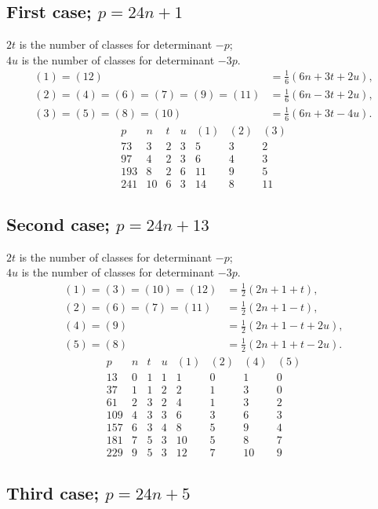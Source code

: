 \documentclass[12pt]{article}
\begin{document}
\subsection*{First case; \(p=24n+1\)}

$2t$ is the number of classes for determinant $-p$;\\
$4u$ is the number of classes for determinant $-3p$.
\[
\begin{aligned}
(1)=(12)&=\frac16(6n+3t+2u),\\
(2)=(4)=(6)=(7)=(9)=(11)&=\frac16(6n-3t+2u),\\
(3)=(5)=(8)=(10)&=\frac16(6n+3t-4u).
\end{aligned}
\]
\[
\begin{array}{r|r|r|r|r|r|r}
p&n&t&u&(1)&(2)&(3)\\\hline
73&3&2&3&5&3&2\\
97&4&2&3&6&4&3\\
193&8&2&6&11&9&5\\
241&10&6&3&14&8&11
\end{array}
\]

\subsection*{Second case; \(p=24n+13\)}

$2t$ is the number of classes for determinant $-p$;\\
$4u$ is the number of classes for determinant $-3p$.
\[
\begin{aligned}
(1)=(3)=(10)=(12)&=\frac12(2n+1+t),\\
(2)=(6)=(7)=(11)&=\frac12(2n+1-t),\\
(4)=(9)&=\frac12(2n+1-t+2u),\\
(5)=(8)&=\frac12(2n+1+t-2u).
\end{aligned}
\]
\[
\begin{array}{r|r|r|r|r|r|r|r}
p&n&t&u&(1)&(2)&(4)&(5)\\\hline
13&0&1&1&1&0&1&0\\
37&1&1&2&2&1&3&0\\
61&2&3&2&4&1&3&2\\
109&4&3&3&6&3&6&3\\
157&6&3&4&8&5&9&4\\
181&7&5&3&10&5&8&7\\
229&9&5&3&12&7&10&9
\end{array}
\]

\subsection*{Third case; \(p=24n+5\)}
\end{document}
